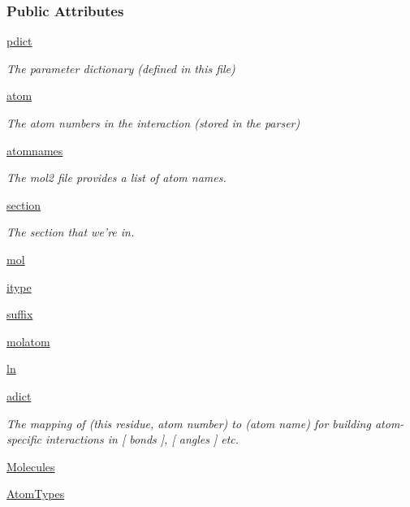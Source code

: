 \subsubsection*{Public Attributes}
\begin{DoxyCompactItemize}
\item 
\hyperlink{classforcebalance_1_1amberio_1_1Mol2__Reader_aae5bd56851f584f35fd7d8d6aac46996}{pdict}
\begin{DoxyCompactList}\small\item\em The parameter dictionary (defined in this file) \end{DoxyCompactList}\item 
\hyperlink{classforcebalance_1_1amberio_1_1Mol2__Reader_a03d9efc9a25c339fe2dcd83aca20fde8}{atom}
\begin{DoxyCompactList}\small\item\em The atom numbers in the interaction (stored in the parser) \end{DoxyCompactList}\item 
\hyperlink{classforcebalance_1_1amberio_1_1Mol2__Reader_a8ac078ee1a9b7a7d8837d5822564376a}{atomnames}
\begin{DoxyCompactList}\small\item\em The mol2 file provides a list of atom names. \end{DoxyCompactList}\item 
\hyperlink{classforcebalance_1_1amberio_1_1Mol2__Reader_a748ad6976c24a436086c3fdfc5716a3b}{section}
\begin{DoxyCompactList}\small\item\em The section that we're in. \end{DoxyCompactList}\item 
\hyperlink{classforcebalance_1_1amberio_1_1Mol2__Reader_a947b948e4578045e84dc3cf544d7e26b}{mol}
\item 
\hyperlink{classforcebalance_1_1amberio_1_1Mol2__Reader_a243fd24ffd1c5a83a034468ac9265216}{itype}
\item 
\hyperlink{classforcebalance_1_1amberio_1_1Mol2__Reader_af8d28632564eca23e96ed3fe4000a985}{suffix}
\item 
\hyperlink{classforcebalance_1_1amberio_1_1Mol2__Reader_a75875d4096851aa493efa822a305c47a}{molatom}
\item 
\hyperlink{classforcebalance_1_1BaseReader_a80c8e3bea212600742968aa8669e557b}{ln}
\item 
\hyperlink{classforcebalance_1_1BaseReader_a2c46ad6b66cf09a30e917ce4a1997e2a}{adict}
\begin{DoxyCompactList}\small\item\em The mapping of (this residue, atom number) to (atom name) for building atom-\/specific interactions in \mbox{[} bonds \mbox{]}, \mbox{[} angles \mbox{]} etc. \end{DoxyCompactList}\item 
\hyperlink{classforcebalance_1_1BaseReader_a4369b5fb663a83b11602daa71db6862e}{Molecules}
\item 
\hyperlink{classforcebalance_1_1BaseReader_a69ca7d949a4a3df4d9f61e617fe0e270}{Atom\-Types}
\end{DoxyCompactItemize}


